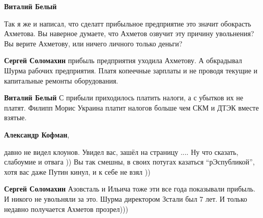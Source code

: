 \begin{itemize}
\begin{itemize}
\textbf{Виталий Белый} 

Так я же и написал, что сделатт прибыльное предприятие это значит обокрасть
Ахметова. Вы наверное думаете, что Ахметов озвучит эту причину увольнения? Вы
верите Ахметову, или ничего личного только деньги?

\textbf{Сергей Соломахин} прибыль предприятия уходила Ахметову. А обкрадывал Шурма рабочих предприятия. Платя копеечные зарплаты и не проводя текущие и капитальные ремонты оборудования.

\textbf{Виталий Белый} С прибыли приходилось платить налоги, а с убытков их не платят. Филипп Морис Украина платит налогов больше чем СКМ и ДТЭК вместе взятые.

\textbf{Александр Кофман}, 

давно не видел клоунов. Увидел вас, зашёл на страницу .... Ну что сказать,
слабоумие и отвага )) Вы так смешны, в своих потугах казаться \enquote{рЭспубликой},
хотя вас даже Путин кинул, и к себе не взял ))

\textbf{Сергей Соломахин} Азовсталь и Ильича тоже эти все года показывали прибыль. И никого не увольняли за это. Шурма директором Зстали был 7 лет. И только недавно получается Ахметов прозрел)))

\end{itemize} %

\end{itemize} %
